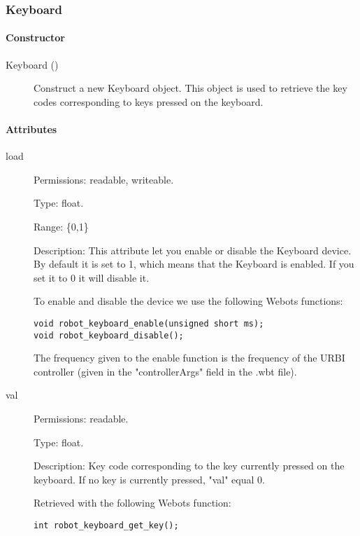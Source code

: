 \subsubsection{Keyboard}
\label{webots.uobjects.robotdevices.keyboard}%

\paragraph{Constructor}
\label{webots.uobjects.robotdevices.keyboard.constructor}%

\noindent
\begin{description}
\item[{Keyboard ()}]      Construct a new Keyboard object. This object is used to retrieve the
          key codes corresponding to keys pressed on the keyboard.

\end{description}

\paragraph{Attributes}
\label{webots.uobjects.robotdevices.keyboard.attributes}%

\noindent
\begin{description}
\item[{load}]     Permissions: readable, writeable.


  Type: float.


  Range: \{0,1\}


  Description: This attribute let you enable or disable the Keyboard
  device.  By default it is set to 1, which means that the Keyboard is
  enabled. If you set it to 0 it will disable it.


          To enable and disable the device we use the following Webots functions:


\begin{lstlisting}[firstnumber=1,]
void robot_keyboard_enable(unsigned short ms);
void robot_keyboard_disable();
\end{lstlisting}

          The frequency given to the enable function is the frequency of the
          URBI controller (given in the "controllerArgs" field in the .wbt file).

\item[{         val
 }]            Permissions: readable.


 Type: float.


 Description: Key code corresponding to the key currently pressed on
 the keyboard. If no key is currently pressed, "val" equal 0.


          Retrieved with the following Webots function:


\begin{lstlisting}[firstnumber=1,]
int robot_keyboard_get_key();
\end{lstlisting}
\end{description}


